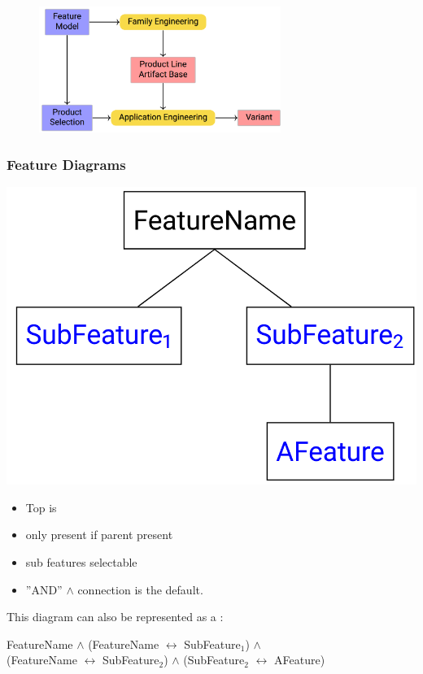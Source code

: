 \documentclass[
    ../../Software_Engineering_Summary.tex,
]
{subfiles}
\begin{document}
\begin{figure}
    [H]
    \centering
    \includegraphics[width = 0.7\textwidth]{Pics/12/SPLESchema.png}
\end{figure}

\subsubsection{Feature Diagrams}
\begin{minipage}
    [c]{0.35\textwidth}
    \centering
    \includegraphics[width = \textwidth]{Pics/12/FeatureDiagramDefault.png}
\end{minipage}
\begin{minipage}
    [c]{0.65\textwidth}
    \begin{itemize}
        \item Top is 
        \item {} only present if parent present
        \item {} sub features selectable
        \item ''AND'' $\land$ connection is the default.
    \end{itemize}

    \vspace{10pt}
    This diagram can also be represented as a :
    
    \begin{defbox}
        FeatureName $\land$ (FeatureName $\leftrightarrow$ SubFeature$_1$) $\land$\\ (FeatureName $\leftrightarrow$ SubFeature$_2$) $\land$ (SubFeature$_2$ $\leftrightarrow$ AFeature)
    \end{defbox}
\end{minipage}
\end{document}
